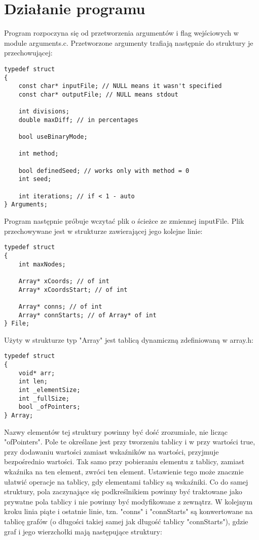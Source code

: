 \documentclass{article}
\begin{document}
\section{Działanie programu}
Program rozpoczyna się od przetworzenia argumentów i flag wejściowych w module arguments.c. Przetworzone argumenty trafiają następnie do struktury je przechowującej:
\begin{verbatim}
typedef struct
{
	const char* inputFile; // NULL means it wasn't specified
	const char* outputFile; // NULL means stdout

	int divisions;
	double maxDiff; // in percentages

	bool useBinaryMode;

	int method;

	bool definedSeed; // works only with method = 0
	int seed;

	int iterations; // if < 1 - auto
} Arguments;
\end{verbatim}
Program następnie próbuje wczytać plik o ścieżce ze zmiennej inputFile. Plik przechowywane jest w strukturze zawierającej jego kolejne linie:
\begin{verbatim}
typedef struct
{
    int maxNodes;

    Array* xCoords; // of int
    Array* xCoordsStart; // of int

    Array* conns; // of int
    Array* connStarts; // of Array* of int
} File;
\end{verbatim}
Użyty w strukturze typ "Array" jest tablicą dynamiczną zdefiniowaną w array.h:
\begin{verbatim}
typedef struct
{
    void* arr;
    int len;
    int _elementSize;
    int _fullSize;
    bool _ofPointers;
} Array;
\end{verbatim}
Nazwy elementów tej struktury powinny być dość zrozumiałe, nie licząc "ofPointers". Pole te określane jest przy tworzeniu tablicy i w przy wartości true, przy dodawaniu wartości zamiast wskaźników na wartości, przyjmuje bezpośrednio wartości. Tak samo przy pobieraniu elementu z tablicy, zamiast wkaźnika na ten element, zwróci ten element. Ustawienie tego może znacznie ułatwić operacje na tablicy, gdy elementami tablicy są wskaźniki. Co do samej struktury, pola zaczynające się podkreślnikiem powinny być traktowane jako prywatne pola tablicy i nie powinny być modyfikowane z zewnątrz.
W kolejnym kroku linia piąte i ostatnie linie, tzn. "conns" i "connStarts" są konwertowane na tablicę grafów (o długości takiej samej jak długość tablicy "connStarts"), gdzie graf i jego wierzchołki mają następujące struktury:
\end{document}
